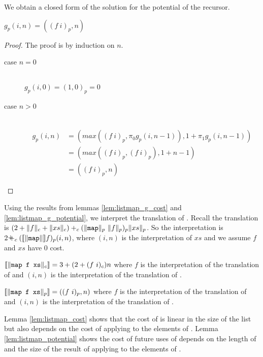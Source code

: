 %
We obtain a closed form of the solution for the potential of the recursor.
%
\begin{lemma}
  \label{lem:listmap_g_potential}
  $g_p(i,n) = ((f\ i)_p, n)$
\end{lemma}
%
\begin{proof}
  The proof is by induction on $n$.
  \begin{description}
    \item[case $n=0$]\hfill \\
      $g_p(i,0) = (1,0)_p = 0$
    \item[case $n>0$]\hfill \\
      \begin{align*}
        g_p(i,n) &= (max((f\ i)_p,\pi_0g_p(i,n-1)), 1 + \pi_1 g_p(i,n-1)) \\
                 &= (max((f\ i)_p, (f\ i)_p), 1 + n - 1) \\
                 &= ((f\ i)_p, n)
      \end{align*}
  \end{description}
\end{proof}
%
Using the results from lemmas \ref{lem:listmap_g_cost} and
\ref{lem:listmap_g_potential}, we interpret the translation of .
Recall the translation is $(2 + \|f\|_c + \|xs\|_c) +_c (\|\T{map}\|_p\ \|f\|_p)_p \|xs\|_p$.
So the interpretation is $2 \pplus_c (\llbracket\|\T{map}\|\rrbracket f)_p (i,n)$,
where $(i,n)$ is the interpretation of $xs$ and we assume $f$ and $xs$ have $0$
cost.
%
\begin{lemma}
  \label{lem:listmap_cost}
  $\llbracket\|\texttt{map f xs}\|_c\rrbracket = 3 + (2 + (f\ i)_c)n$ where $f$ is the
  interpretation of the translation of  and $(i,n)$ is the interpretation
  of the translation of .
\end{lemma}
%
\begin{lemma}
  \label{lem:listmap_potential}
  $\llbracket\|\T{map f xs}\|_p\rrbracket = ((f\ i)_p,n)$ where $f$ is the
  interpretation of the translation of  and $(i,n)$ is the interpretation
  of the translation of .
\end{lemma}
%
Lemma \ref{lem:listmap_cost} shows that the cost of  is linear in
the size of the list but also depends on the cost of applying  to the
elements of . Lemma \ref{lem:listmap_potential} shows the cost of future
uses of  depends on the length of  and the size of the result
of applying  to the elements of .
